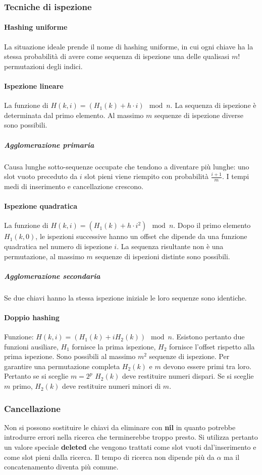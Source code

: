 \subsubsection{Tecniche di ispezione}
\paragraph{Hashing uniforme}
La situazione ideale prende il nome di hashing uniforme, in cui ogni chiave ha la stessa probabilit\`a di avere come sequenza di ispezione una delle 
qualisasi $m!$ permutazioni degli indici. 
\paragraph{Ispezione lineare}
La funzione di $H(k, i)= (H_1(k)+h\cdot i)\mod n$. La sequenza di ispezione \`e determinata dal primo elemento. Al massimo $m$ sequenze di ispezione diverse
sono possibili. 
\subparagraph{Agglomerazione primaria}
Causa lunghe sotto-sequenze occupate che tendono a diventare pi\`u lunghe: uno slot vuoto preceduto da $i$ slot pieni viene riempito con probabilit\`a 
$\frac{i+1}{m}$. I tempi medi di inserimento e cancellazione crescono.
\paragraph{Ispezione quadratica}
La funzione di $H(k, i)= (H_1(k)+h\cdot i^2)\mod n$. Dopo il primo elemento $H_1(k, 0)$, le ispezioni successive hanno un offset che dipende da una funzione
quadratica nel numero di ispezione $i$. La sequenza risultante non \`e una permutazione, al massimo $m$ sequenze di ispezioni distinte sono possibili.
\subparagraph{Agglomerazione secondaria}
Se due chiavi hanno la stessa ispezione iniziale le loro sequenze sono identiche. 
\paragraph{Doppio hashing}
Funzione: $H(k, i)=(H_1(k)+ iH_2(k))\mod n$. Esistono pertanto due funzioni ausiliare, $H_1$ fornisce la prima ispezione, $H_2$ fornisce l'offset rispetto
alla prima ispezione. Sono possibili al massimo $m^2$ sequenze di ispezione. Per garantire una permutazione completa $H_2(k)$ e $m$ devono essere primi tra
loro. Pertanto se si sceglie $m=2^p$ $H_2(k)$ deve restituire numeri dispari. Se si sceglie $m$ primo, $H_2(k)$ deve restituire numeri minori di $m$. 
\subsubsection{Cancellazione}
Non si possono sostituire le chiavi da eliminare con \textbf{nil} in quanto potrebbe introdurre errori nella ricerca che terminerebbe troppo presto. Si
utilizza pertanto un valore speciale \textbf{deleted} che vengono trattati come slot vuoti dal'inserimento e come slot pieni dalla ricerca. Il tempo di 
ricerca non dipende pi\`u da $\alpha$ ma il concatenamento diventa pi\`u comune.
\newpage
